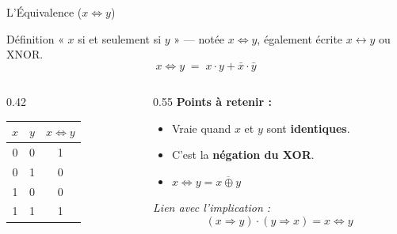 \begin{frame}{L'Équivalence (\(x \Leftrightarrow y\))}

    \begin{block}{Définition}
        « \(x\) si et seulement si \(y\) » — notée \(x \Leftrightarrow y\), également écrite \(x \leftrightarrow y\) ou XNOR.
        \[
            x \Leftrightarrow y \;=\; x \cdot y + \bar{x} \cdot \bar{y}
        \]
    \end{block}

    \vspace{0.4cm}

    \begin{columns}[T]
        \begin{column}{0.42\textwidth}
            \centering
            \begin{tabular}{|c|c|c|}
                \hline
                \(x\) & \(y\) & \(x \Leftrightarrow y\) \\
                \hline
                0 & 0 & 1 \\
                0 & 1 & 0 \\
                1 & 0 & 0 \\
                1 & 1 & 1 \\
                \hline
            \end{tabular}
        \end{column}
        \begin{column}{0.55\textwidth}
            \textbf{Points à retenir :}
            \begin{itemize}
                \item Vraie quand \(x\) et \(y\) sont \textbf{identiques}.
                \item C'est la \textbf{négation du XOR}.
                \item \(x \Leftrightarrow y = \overline{x \oplus y}\)
            \end{itemize}

            \vspace{0.3cm}
            \textit{Lien avec l'implication :}
            \[
                (x \Rightarrow y) \cdot (y \Rightarrow x) = x \Leftrightarrow y
            \]
        \end{column}
    \end{columns}

\end{frame}

